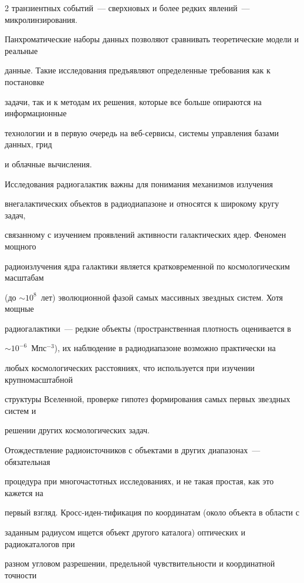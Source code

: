 \begin{multicols}{2}
транзиентных событий~--- сверхновых и более редких явлений~--- микролинзирования. 

Панхроматические наборы данных позволяют сравнивать теоретические модели и реальные 

данные. \mbox{Такие} исследования предъявляют определенные требования как к постановке 

задачи, так и к методам их решения, которые все больше опираются на информационные 

технологии и в первую очередь на веб-сер\-ви\-сы, системы управления базами данных, грид 

и облачные вычисления. 

      

      Исследования радиогалактик важны для понимания механизмов излучения 

внегалактических объектов в радиодиапазоне и относятся к широкому кругу задач, 

связанному с изучением проявлений активности галактических ядер. Феномен мощного 

радиоизлучения ядра галактики является кратковременной по космологическим масштабам\linebreak 

(до $\sim10^8$~лет) эволюционной фазой самых массивных звездных систем. Хотя мощные 

радио\-га\-лактики~--- редкие объекты (пространственная плот\-ность оценивается в 

      $\sim10^{-6}$~Мпс$^{-3}$), их наблюдение в радиодиапазоне возможно практически на 

любых космологических расстояниях, что используется при изучении крупномасштабной 

структуры Вселенной, проверке гипотез формирования самых первых звездных систем и 

решении других космологических задач.

      

      Отождествление радиоисточников с объектами в других диапазонах~--- обязательная 

процедура при многочастотных исследованиях, и не такая прос\-тая, как это кажется на 

первый взгляд. Кросс-иден-\linebreak ти\-фи\-ка\-ция по координатам (около объекта в обла\-сти с 

заданным радиусом ищется объект другого каталога) оптических и радиокаталогов при 

разном угловом разрешении, предельной чув\-ст\-ви\-тель\-ности и координатной точности 


\end{multicols}

